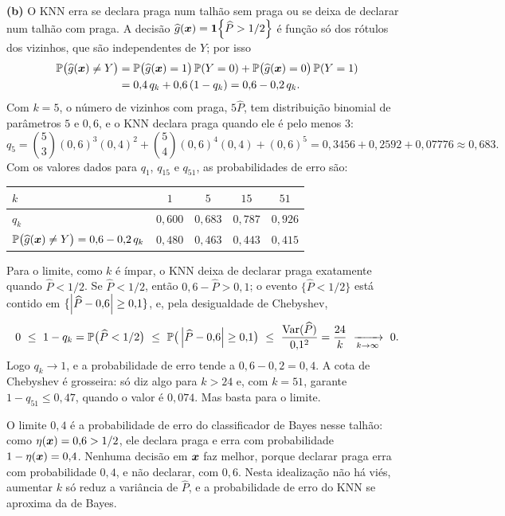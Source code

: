 \begin{solucao}
\smallskip
\textbf{(b)} O KNN erra se declara praga num talhão sem praga ou se deixa de declarar num
talhão com praga. A decisão $\widehat{g}(\bm{x})=\mathbf{1}\!\left\{\widehat P>1/2\right\}$ é função só dos rótulos dos
vizinhos, que são independentes de $Y$; por isso
\begin{align*}
  \mathbb{P}\big(\widehat{g}(\bm{x})\ne Y\big)
  &=\mathbb{P}\big(\widehat{g}(\bm{x})=1\big)\,\mathbb{P}(Y=0)+\mathbb{P}\big(\widehat{g}(\bm{x})=0\big)\,\mathbb{P}(Y=1)\\
  &=0{,}4\,q_k+0{,}6\,(1-q_k)=0{,}6-0{,}2\,q_k .
\end{align*}
Com $k=5$, o número de vizinhos com praga, $5\widehat P$, tem distribuição binomial de
parâmetros $5$ e $0{,}6$, e o KNN declara praga quando ele é pelo menos $3$:
\[
  q_5=\binom53(0{,}6)^3(0{,}4)^2+\binom54(0{,}6)^4(0{,}4)+(0{,}6)^5
     =0{,}3456+0{,}2592+0{,}07776\approx0{,}683 .
\]
Com os valores dados para $q_1$, $q_{15}$ e $q_{51}$, as probabilidades de erro são:
\begin{center}\small
\renewcommand{\arraystretch}{1.25}
\begin{tabular}{@{}lcccc@{}}
\toprule
$k$ & $1$ & $5$ & $15$ & $51$ \\
\midrule
$q_k$ & $0{,}600$ & $0{,}683$ & $0{,}787$ & $0{,}926$ \\
$\mathbb{P}\big(\widehat{g}(\bm{x})\ne Y\big)=0{,}6-0{,}2\,q_k$ & $0{,}480$ & $0{,}463$ & $0{,}443$ & $0{,}415$ \\
\bottomrule
\end{tabular}
\end{center}
Para o limite, como $k$ é ímpar, o KNN deixa de declarar praga exatamente quando
$\widehat P<1/2$. Se $\widehat P<1/2$, então $0{,}6-\widehat P>0{,}1$; o evento
$\{\widehat P<1/2\}$ está contido em $\{\left\lvert \widehat P-0{,}6 \right\rvert\ge0{,}1\}$, e, pela desigualdade
de Chebyshev,
\[
  0\ \le\ 1-q_k=\Prob\big(\widehat P<1/2\big)
  \ \le\ \Prob\big(\abs{\widehat P-0{,}6}\ge0{,}1\big)
  \ \le\ \frac{\Var(\widehat P)}{0{,}1^2}=\frac{24}{k}\ \xrightarrow[k\to\infty]{}\ 0 .
\]
Logo $q_k\to1$, e a probabilidade de erro tende a $0{,}6-0{,}2=0{,}4$. A cota de Chebyshev é
grosseira: só diz algo para $k>24$ e, com $k=51$, garante $1-q_{51}\le0{,}47$, quando o valor é
$0{,}074$. Mas basta para o limite.

O limite $0{,}4$ é a probabilidade de erro do classificador de Bayes nesse talhão: como
$\eta(\bm{x})=0{,}6>1/2$, ele declara praga e erra com probabilidade $1-\eta(\bm{x})=0{,}4$. Nenhuma
decisão em $\bm{x}$ faz melhor, porque declarar praga erra com probabilidade $0{,}4$, e não
declarar, com $0{,}6$. Nesta idealização não há viés, aumentar $k$ só reduz a variância de
$\widehat P$, e a probabilidade de erro do KNN se aproxima da de Bayes.


\end{solucao}
